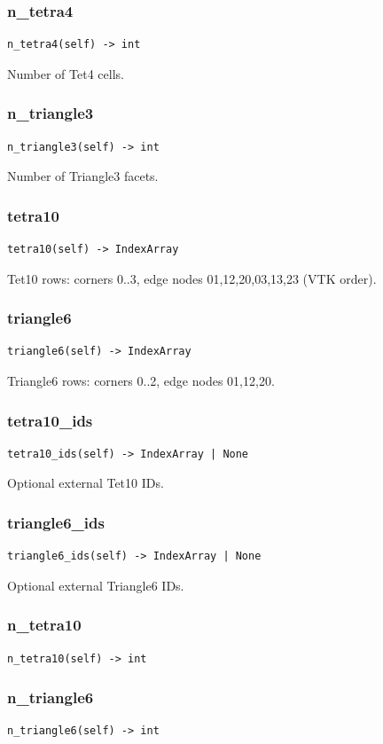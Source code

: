 \subsubsection*{n\_tetra4}
\begin{lstlisting}
n_tetra4(self) -> int
\end{lstlisting}
Number of Tet4 cells.
\subsubsection*{n\_triangle3}
\begin{lstlisting}
n_triangle3(self) -> int
\end{lstlisting}
Number of Triangle3 facets.
\subsubsection*{tetra10}
\begin{lstlisting}
tetra10(self) -> IndexArray
\end{lstlisting}
Tet10 rows: corners 0..3, edge nodes 01,12,20,03,13,23 (VTK order).
\subsubsection*{triangle6}
\begin{lstlisting}
triangle6(self) -> IndexArray
\end{lstlisting}
Triangle6 rows: corners 0..2, edge nodes 01,12,20.
\subsubsection*{tetra10\_ids}
\begin{lstlisting}
tetra10_ids(self) -> IndexArray | None
\end{lstlisting}
Optional external Tet10 IDs.
\subsubsection*{triangle6\_ids}
\begin{lstlisting}
triangle6_ids(self) -> IndexArray | None
\end{lstlisting}
Optional external Triangle6 IDs.
\subsubsection*{n\_tetra10}
\begin{lstlisting}
n_tetra10(self) -> int
\end{lstlisting}
\subsubsection*{n\_triangle6}
\begin{lstlisting}
n_triangle6(self) -> int
\end{lstlisting}

